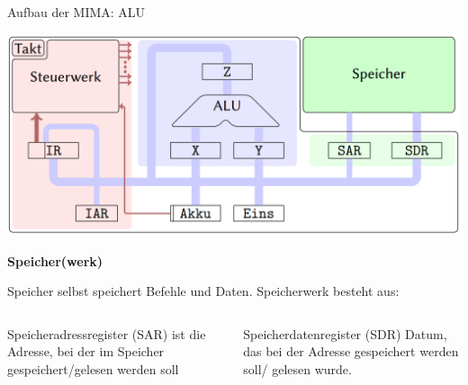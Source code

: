 \documentclass[handout]{beamer}
\begin{document}
\begin{frame}{Aufbau der MIMA: ALU}
\begin{center}\includegraphics[width=.6\textwidth]{images/mima_aufbau.png}\end{center}

\bp

\textcolor{kit-green50}{\textbf{Speicher(werk)}}

Speicher selbst speichert Befehle und Daten. \ip Speicherwerk besteht aus:

\begin{columns}
	\begin{column}{0.5\textwidth}
		\begin{itemize}
			\pitem Speicheradressregister (SAR) ist die Adresse, bei der im Speicher gespeichert/gelesen werden soll
		\end{itemize}
	\end{column}
	
	\begin{column}{0.5\textwidth}
		\begin{itemize}
			\pitem Speicherdatenregister (SDR) Datum, das bei der Adresse gespeichert werden soll/ gelesen wurde.
		\end{itemize}
	\end{column}
\end{columns}

\end{frame}
\end{document}
